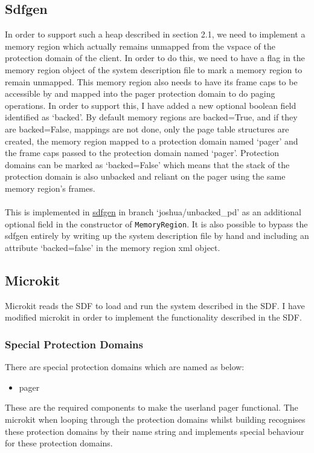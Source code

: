 \documentclass{article}
\begin{document}
\subsection{Sdfgen}
In order to support such a heap described in section 2.1, we need to implement a memory region which actually remains unmapped from the vspace of the protection domain of the client. In order to do this, we need to have a flag in the memory region object of the system description file to mark a memory region to remain unmapped. This memory region also needs to have its frame caps to be accessible by and mapped into the pager protection domain to do paging operations. In order to support this, I have added a new optional boolean field identified as `backed'. By default memory regions are backed=True, and if they are backed=False, mappings are not done, only the page table structures are created, the memory region mapped to a protection domain named `pager' and the frame caps passed to the protection domain named `pager'. Protection domains can be marked as `backed=False' which means that the stack of the protection domain is also unbacked and reliant on the pager using the same memory region's frames.
\\\\
This is implemented in \href{https://github.com/au-ts/microkit_sdf_gen}{sdfgen} in branch `joshua/unbacked\_pd' as an additional optional field in the constructor of \texttt{MemoryRegion}. It is also possible to bypass the sdfgen entirely by writing up the system description file by hand and including an attribute `backed=false' in the memory region xml object.
\subsection{Microkit}
Microkit reads the SDF to load and run the system described in the SDF. I have modified microkit in order to implement the functionality described in the SDF.
\subsubsection{Special Protection Domains}
There are special protection domains which are named as below: \begin{itemize}
    \item pager
\end{itemize}
These are the required components to make the userland pager functional. The microkit when looping through the protection domains whilst building recognises these protection domains by their name string and implements special behaviour for these protection domains.
\end{document}
